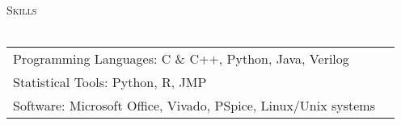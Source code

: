 \documentclass[12pt]{article}
\newcommand{\lineunder} {
    \vspace*{-8pt} \\
    \hspace*{-18pt} \hrulefill \\
}
\newcommand{\header} [1] {
    {\hspace*{-18pt}\vspace*{6pt} \textsc{#1}}
    \vspace*{-6pt} \lineunder
}
\begin{document}
\header{Skills}
\begin{tabular}{ l l }
	Programming Languages: C \& C++, Python, Java, Verilog \\
	Statistical Tools: Python, R, JMP\\
	Software: Microsoft Office, Vivado, PSpice, Linux/Unix systems
\end{tabular}
\vspace{2mm}



\begin{comment}
\header{Projects}
{\textbf{Project Name}} {\sl C++} \hfill link\\
Description\\
\vspace*{2mm}

\header{Awards}
\textbf{Name} \hfill Awarder\\
Summary haoeusnhtaeohueo buheh ueoc uhaeot uhhseo \hfill date\\
\vspace*{2mm}

\
\end{comment}

\
\end{document}
